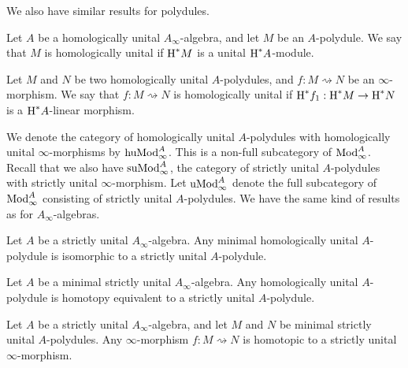 \documentclass[../thesis.tex]{subfiles}
\begin{document}
            We also have similar results for polydules.

            \begin{definition}
                Let $A$ be a homologically unital $A_\infty$-algebra, and let $M$ be an $A$-polydule. We say that $M$ is homologically unital if $\tt{H}^*M$ is a unital $\tt{H}^*A$-module.

                Let $M$ and $N$ be two homologically unital $A$-polydules, and $f : M \rightsquigarrow N$ be an $\infty$-morphism. We say that $f : M \rightsquigarrow N$ is homologically unital if $\tt{H}^*f_1 : \tt{H}^*M \rightarrow \tt{H}^*N$ is a $\tt{H}^*A$-linear morphism.
            \end{definition}

            We denote the category of homologically unital $A$-polydules with homologically unital $\infty$-morphisms by $\tt{huMod}_\infty^A$. This is a non-full subcategory of $\tt{Mod}_\infty^A$. Recall that we also have $\tt{suMod}_\infty^A$, the category of strictly unital $A$-polydules with strictly unital $\infty$-morphism. Let $\tt{uMod}_\infty^A$ denote the full subcategory of $\tt{Mod}_\infty^A$ consisting of strictly unital $A$-polydules. We have the same kind of results as for $A_\infty$-algebras.

            \begin{thm}\label{thm: unit-strict-poly}
                Let $A$ be a strictly unital $A_\infty$-algebra. Any minimal homologically unital $A$-polydule is isomorphic to a strictly unital $A$-polydule.
            \end{thm}

            \begin{corollary}\label{cor: unit-strict-poly}
                Let $A$ be a minimal strictly unital $A_\infty$-algebra. Any homologically unital $A$-polydule is homotopy equivalent to a strictly unital $A$-polydule.
            \end{corollary}

            \begin{thm}
                Let $A$ be a strictly unital $A_\infty$-algebra, and let $M$ and $N$ be minimal strictly unital $A$-polydules. Any $\infty$-morphism $f : M \rightsquigarrow N$ is homotopic to a strictly unital $\infty$-morphism.
            \end{thm}
\end{document}
